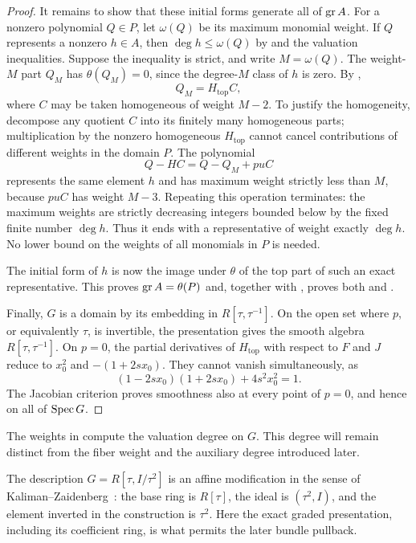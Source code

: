 \begin{proof}
It remains to show that these initial forms generate all of $\operatorname{gr} A$.
For a nonzero polynomial $Q\in P$, let $\omega(Q)$ be its maximum
monomial weight.  If $Q$ represents a nonzero $h\in A$, then
$\deg h\leq\omega(Q)$ by  and the
valuation inequalities.  Suppose the inequality is strict, and write
$M=\omega(Q)$.  The weight-$M$ part $Q_M$ has
$\theta(Q_M)=0$, since the degree-$M$ class of $h$ is zero.
By ,
\[
 Q_M=H_{\mathrm{top}}C,
\]
where $C$ may be taken homogeneous of weight $M-2$.  To justify the
homogeneity, decompose any quotient $C$ into its finitely many
homogeneous parts; multiplication by the nonzero homogeneous
$H_{\mathrm{top}}$ cannot cancel contributions of different weights
in the domain $P$.
The polynomial
\[
 Q-HC=Q-Q_M+puC
\]
represents the same element $h$ and has maximum weight strictly less
than $M$, because $puC$ has weight $M-3$.
Repeating this operation terminates: the maximum weights are strictly
decreasing integers bounded below by the fixed finite number $\deg h$.
Thus it ends with a representative of weight exactly $\deg h$.
No lower bound on the weights of all monomials in $P$ is needed.

The initial form of $h$ is now the image under $\theta$ of the top
part of such an exact representative.  This proves
$\operatorname{gr} A=\theta(P)$ and, together with , proves both
 and .

Finally, $G$ is a domain by its embedding in
$R[\tau,\tau^{-1}]$.  On the open set where $p$, or equivalently
$\tau$, is invertible, the presentation gives the smooth algebra
$R[\tau,\tau^{-1}]$.  On $p=0$, the partial derivatives of
$H_{\mathrm{top}}$ with respect to $F$ and $J$ reduce to
$x_0^2$ and $-(1+2sx_0)$.  They cannot vanish simultaneously, as
\[
 (1-2sx_0)(1+2sx_0)+4s^2x_0^2=1.
\]
The Jacobian criterion proves smoothness also at every point of
$p=0$, and hence on all of $\operatorname{Spec} G$.
\end{proof}

The weights in  compute the valuation
degree on $G$.  This degree will remain distinct from the fiber
weight and the auxiliary degree introduced later.

The description $G=R[\tau,I/\tau^2]$ is an affine modification in
the sense of Kaliman--Zaidenberg~\cite[Definition~1.1]{KalimanZaidenberg}:
the base ring is $R[\tau]$, the ideal is $(\tau^2,I)$, and the
element inverted in the construction is $\tau^2$. Here the exact
graded presentation, including its coefficient ring, is what permits
the later bundle pullback.

